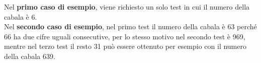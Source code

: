 

\Examples
\begin{example}
%
%
\end{example}


\Explanation
Nel \textbf{primo caso di esempio}, viene richiesto un solo test in cui il numero della cabala \`e 6.\\[2mm]
Nel \textbf{secondo caso di esempio}, nel primo test il numero della cabala \`e 63 perch\'e 66 ha due cifre uguali consecutive, per lo stesso motivo nel secondo test \`e 969, mentre nel terzo test il resto 31 pu\`o essere ottenuto per esempio con il numero della cabala 639.
